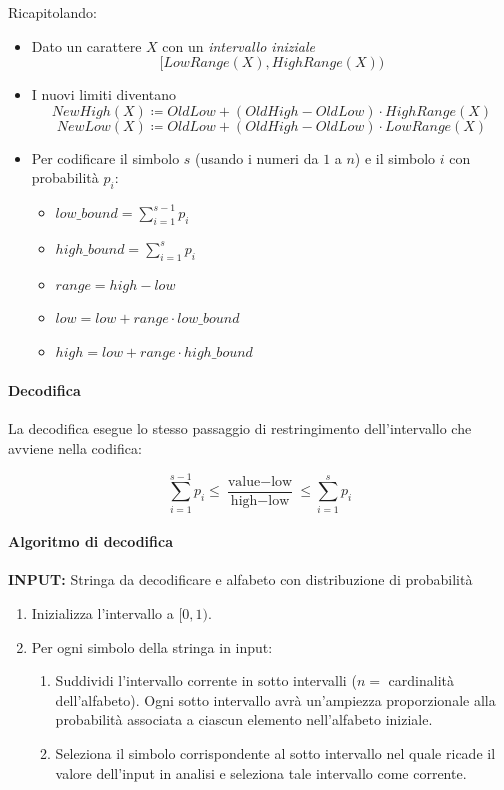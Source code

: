 Ricapitolando:
\begin{itemize}
    \item Dato un carattere $X$ con un \textit{intervallo iniziale}
    \[ [ \mathit{LowRange}(X), \mathit{HighRange}(X) ) \] 
    \item I nuovi limiti diventano
    \[\mathit{NewHigh}(X) \coloneq \mathit{OldLow} + (\mathit{OldHigh} - \mathit{OldLow}) \cdot \mathit{HighRange}(X)\]
    \[\mathit{NewLow}(X) \coloneq \mathit{OldLow} + (\mathit{OldHigh} - \mathit{OldLow}) \cdot \mathit{LowRange}(X)\]
    \item  Per codificare il simbolo $s$ (usando i numeri da $1$ a $n$) e il simbolo $i$ con probabilità $p_i$:
    \begin{itemize}
    \item $\mathit{low\_bound} = \sum_{i=1}^{s-1}p_i$
    \item $\mathit{high\_bound} = \sum_{i=1}^{s}p_i$
    \item $\mathit{range} = \mathit{high} - \mathit{low}$
    \item $\mathit{low} = \mathit{low} + \mathit{range} \cdot \mathit{low\_bound} $
    \item $\mathit{high} = \mathit{low} + \mathit{range} \cdot \mathit{high\_bound} $
    \end{itemize}
\end{itemize}

\paragraph{Decodifica}

La decodifica esegue lo stesso passaggio di restringimento dell'intervallo che avviene nella codifica:

\[\sum_{i=1}^{s-1}p_i \leq \frac{\text{value} - \text{low}}{\text{high} - \text{low}} \leq \sum_{i=1}^{s}p_i \]

\paragraph*{Algoritmo di decodifica}

\noindent
\textbf{INPUT:} Stringa da decodificare e alfabeto con distribuzione di probabilità

\begin{enumerate}
    \item Inizializza l'intervallo a $[0,1)$.
    \item Per ogni simbolo della stringa in input:
    \begin{enumerate}
        \item Suddividi l'intervallo corrente in sotto intervalli ($n=$ cardinalità dell'alfabeto). Ogni sotto intervallo avrà un'ampiezza proporzionale alla probabilità associata a ciascun elemento nell'alfabeto iniziale.
        \item Seleziona il simbolo corrispondente al sotto intervallo nel quale ricade il valore dell'input in analisi e seleziona tale intervallo come corrente.
    \end{enumerate}
\end{enumerate}


